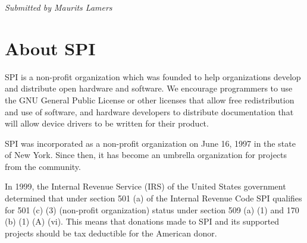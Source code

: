 \documentclass[letterpaper]{report}
\begin{document}
{\em Submitted by Maurits Lamers}


\appendix
\chapter{About SPI}

SPI is a non-profit organization which was founded to help organizations
develop and distribute open hardware and software. We encourage programmers
to use the GNU General Public License or other licenses that allow free
redistribution and use of software, and hardware developers to distribute
documentation that will allow device drivers to be written for their product.

SPI was incorporated as a non-profit organization on June 16, 1997 in the state
of New York. Since then, it has become an umbrella organization for projects
from the community.

In 1999, the Internal Revenue Service (IRS) of the United States government
determined that under section 501 (a) of the Internal Revenue Code SPI
qualifies for 501 (c) (3) (non-profit organization) status under section 509
(a) (1) and 170 (b) (1) (A) (vi). This means that donations made to SPI and its
supported projects should be tax deductible for the American donor.
\end{document}
